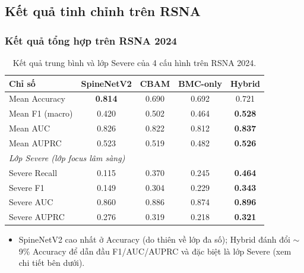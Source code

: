 \documentclass{beamer}
\numberwithin{figure}{section}
\numberwithin{table}{section}
\begin{document}
\subsection{Kết quả tinh chỉnh trên RSNA}
\begin{frame}
\frametitle{Kết quả tổng hợp trên RSNA 2024}
\begin{table}
\centering
\small
\begin{tabular}{lcccc}
\toprule
\textbf{Chỉ số} & \textbf{SpineNetV2} & \textbf{CBAM} & \textbf{BMC-only} & \textbf{Hybrid} \\
\midrule
Mean Accuracy   & \textbf{0.814} & 0.690 & 0.692 & 0.721 \\
Mean F1 (macro) & 0.420 & 0.502 & 0.464 & \textbf{0.528} \\
Mean AUC        & 0.826 & 0.822 & 0.812 & \textbf{0.837} \\
Mean AUPRC      & 0.523 & 0.519 & 0.482 & \textbf{0.526} \\
\midrule
\multicolumn{5}{l}{\textit{Lớp Severe (lớp focus lâm sàng)}} \\
Severe Recall   & 0.115 & 0.370 & 0.245 & \textbf{0.464} \\
Severe F1       & 0.149 & 0.304 & 0.229 & \textbf{0.343} \\
Severe AUC      & 0.860 & 0.886 & 0.874 & \textbf{0.896} \\
Severe AUPRC    & 0.276 & 0.319 & 0.218 & \textbf{0.321} \\
\bottomrule
\end{tabular}
\caption{Kết quả trung bình và lớp Severe của 4 cấu hình trên RSNA 2024.}
\end{table}
\begin{itemize}
    \item[$\rightarrow$] SpineNetV2 cao nhất ở Accuracy (do thiên về lớp đa số); Hybrid đánh đổi $\sim$9\% Accuracy để dẫn đầu F1/AUC/AUPRC và đặc biệt là lớp Severe (xem chi tiết bên dưới).
\end{itemize}
\end{frame}
\end{document}
